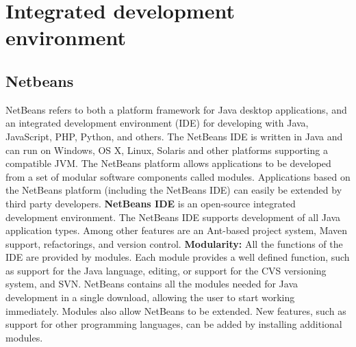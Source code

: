 \section{Integrated development environment}

\subsection{Netbeans}
NetBeans refers to both a platform framework for Java desktop applications, and an integrated development environment (IDE) for developing with Java, JavaScript, PHP, Python, and others.
The NetBeans IDE is written in Java and can run on Windows, OS X, Linux, Solaris and other platforms supporting a compatible JVM. 
\newline
\newline
The NetBeans platform allows applications to be developed from a set of modular software components called modules. Applications based on the NetBeans platform (including the NetBeans IDE) can easily be extended by third party developers.
\newline
\newline
\textbf{NetBeans IDE} is an open-source integrated development environment. The NetBeans IDE supports development of all Java application types. Among other features are an Ant-based project system, Maven support, refactorings, and version control.
\textbf{Modularity:} All the functions of the IDE are provided by modules. Each module provides a well defined function, such as support for the Java language, editing, or support for the CVS versioning system, and SVN. NetBeans contains all the modules needed for Java development in a single download, allowing the user to start working immediately. Modules also allow NetBeans to be extended. New features, such as support for other programming languages, can be added by installing additional modules.